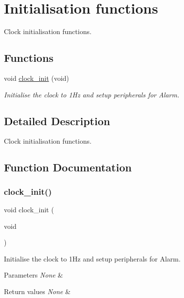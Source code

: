 \hypertarget{group___clock___init}{}\section{Initialisation functions}
\label{group___clock___init}


Clock initialisation functions.  


\subsection*{Functions}
\begin{DoxyCompactItemize}
\item 
void \hyperlink{group___clock___init_ga78ab77b57cf2e00089f0a3a22508524c}{clock\+\_\+init} (void)
\begin{DoxyCompactList}\small\item\em Initialise the clock to 1\+Hz and setup peripherals for Alarm. \end{DoxyCompactList}\end{DoxyCompactItemize}


\subsection{Detailed Description}
Clock initialisation functions. 



\subsection{Function Documentation}
\mbox{\label{group___clock___init_ga78ab77b57cf2e00089f0a3a22508524c}} 
\subsubsection{\texorpdfstring{clock\+\_\+init()}{clock\_init()}}
{\footnotesize\ttfamily void clock\+\_\+init (\begin{DoxyParamCaption}\item[{void}]{ }\end{DoxyParamCaption})}



Initialise the clock to 1\+Hz and setup peripherals for Alarm. 


\begin{DoxyParams}{Parameters}
{\em None} & \\
\hline
\end{DoxyParams}

\begin{DoxyRetVals}{Return values}
{\em None} & \\
\hline
\end{DoxyRetVals}
